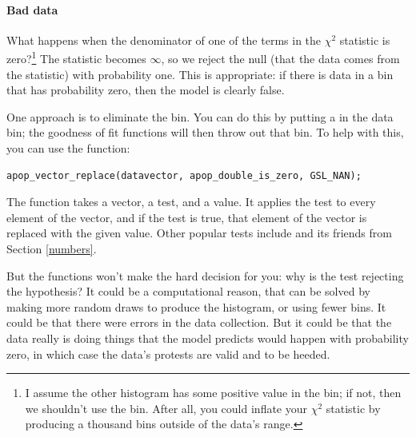 \paragraph{\treesymbol Bad data} What happens when the denominator of
one of the terms in the $\chi^2$ statistic is zero?\footnote{I assume
the other histogram has some positive value in the bin; if not, then
we shouldn't use the bin. After all, you could inflate your $\chi^2$
statistic by producing a thousand bins outside of the data's range.} The
statistic becomes $\infty$, so we reject the null (that the data comes
from the statistic) with probability one. This is appropriate: if there is
data in a bin that has probability zero, then the model is clearly false.

One approach is to eliminate the bin. You can do this by putting a
 in the data bin; the goodness of fit functions will
then throw out that bin. To help with this, you can use the
 function:
\begin{lstlisting}
apop_vector_replace(datavector, apop_double_is_zero, GSL_NAN);
\end{lstlisting}
The function takes a vector, a test, and a  value. It
applies the test to every element of the vector, and if the test is
true, that element of the vector is replaced with the given value. Other
popular tests include  and its friends from Section
\ref{numbers}.

But the functions won't make the hard decision for you: why is the test
rejecting the hypothesis? It could be a computational reason, that can be solved by  making more random draws to produce the histogram, or using fewer bins.
It could be that there were errors in the  data collection.
But it could be that the data really is doing things that the model
predicts would happen with probability zero, in which case the data's
protests are valid and to be heeded.
